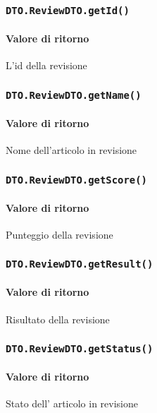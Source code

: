 \subsubsection{\texttt{DTO.ReviewDTO.getId()}}
\paragraph{Valore di ritorno}
\begin{description}
\item L'id della revisione
\end{description}
\subsubsection{\texttt{DTO.ReviewDTO.getName()}}
\paragraph{Valore di ritorno}
\begin{description}
\item Nome dell'articolo in revisione
\end{description}
\subsubsection{\texttt{DTO.ReviewDTO.getScore()}}
\paragraph{Valore di ritorno}
\begin{description}
\item Punteggio della revisione
\end{description}
\subsubsection{\texttt{DTO.ReviewDTO.getResult()}}
\paragraph{Valore di ritorno}
\begin{description}
\item Risultato della revisione
\end{description}
\subsubsection{\texttt{DTO.ReviewDTO.getStatus()}}
\paragraph{Valore di ritorno}
\begin{description}
\item Stato dell' articolo in revisione
\end{description}


